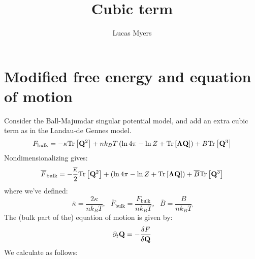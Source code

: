 \documentclass[reqno]{article}
\begin{document}
	\title{Cubic term}
	\author{Lucas Myers}
	\maketitle

    \section{Modified free energy and equation of motion}

    Consider the Ball-Majumdar singular potential model, and add an extra cubic term as in the Landau-de Gennes model.
    \begin{equation}
        F_\text{bulk}
        =
        -\kappa \text{Tr} \left[ \mathbf{Q}^2 \right]
        + n k_B T \left(
            \ln 4 \pi
            - \ln Z
            + \text{Tr} \left[ \boldsymbol{\Lambda}\mathbf{Q} \right]
        \right)
        +
        B \text{Tr} \left[ \mathbf{Q}^3 \right]
    \end{equation}
    Nondimensionalizing gives:
    \begin{equation}
        \overline{F}_\text{bulk}
        =
        -\frac{\overline{\kappa}}{2} \text{Tr} \left[ \mathbf{Q}^2 \right]
        + \left(
            \ln 4 \pi
            - \ln Z
            + \text{Tr} \left[ \boldsymbol{\Lambda}\mathbf{Q} \right]
        \right)
        +
        \overline{B} \text{Tr} \left[ \mathbf{Q}^3 \right]
    \end{equation}
    where we've defined:
    \begin{equation}
        \overline{\kappa}
        =
        \frac{2 \kappa}{n k_B T},
        \:\:\:
        \overline{F}_\text{bulk}
        =
        \frac{F_\text{bulk}}{n k_B T},
        \:\:\:
        \overline{B}
        =
        \frac{B}{n k_B T}
    \end{equation}
    The (bulk part of the) equation of motion is given by:
    \begin{equation}
        \partial_t \mathbf{Q}
        =
        -\frac{\delta F}{\delta \mathbf{Q}}
    \end{equation}
    We calculate as follows:
\end{document}
